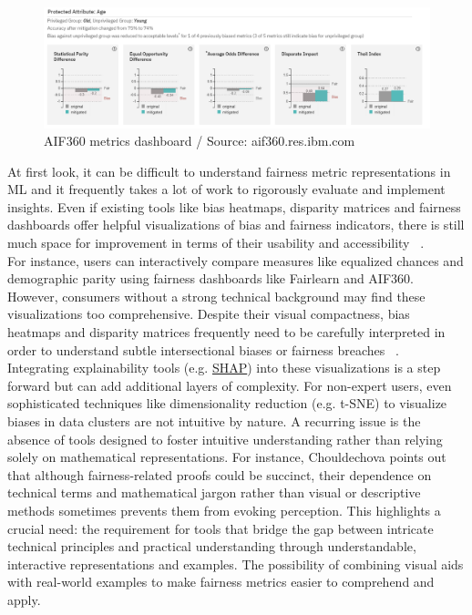 \documentclass[runningheads]{llncs}
\begin{document}
\begin{figure}
\includegraphics[width=\textwidth]{images/aif360.png}
\caption{AIF360 metrics dashboard / Source: aif360.res.ibm.com} \label{aif360}
\end{figure}

At first look, it can be difficult to understand fairness metric representations in ML and it frequently takes a lot of work to rigorously evaluate and implement insights. Even if existing tools like bias heatmaps, disparity matrices and fairness dashboards offer helpful visualizations of bias and fairness indicators, there is still much space for improvement in terms of their usability and accessibility ~\cite{mbakwe2023}.\\

For instance, users can interactively compare measures like equalized chances and demographic parity using fairness dashboards like Fairlearn and AIF360. However, consumers without a strong technical background may find these visualizations too comprehensive. Despite their visual compactness, bias heatmaps and disparity matrices frequently need to be carefully interpreted in order to understand subtle intersectional biases or fairness breaches ~\cite{zohar2023}.\\

Integrating explainability tools (e.g. \href{https://shap.readthedocs.io/en/latest/}{SHAP}) into these visualizations is a step forward but can add additional layers of complexity. For non-expert users, even sophisticated techniques like dimensionality reduction (e.g. t-SNE) to visualize biases in data clusters are not intuitive by nature. A recurring issue is the absence of tools designed to foster intuitive understanding rather than relying solely on mathematical representations. For instance, Chouldechova \cite{chouldechova2017} points out that although fairness-related proofs could be succinct, their dependence on technical terms and mathematical jargon rather than visual or descriptive methods sometimes prevents them from evoking perception. This highlights a crucial need: the requirement for tools that bridge the gap between intricate technical principles and practical understanding through understandable, interactive representations and examples. The possibility of combining visual aids with real-world examples to make fairness metrics easier to comprehend and apply.\\
\end{document}
